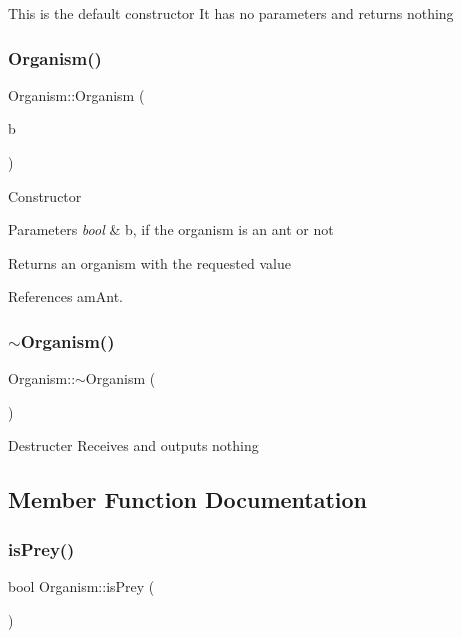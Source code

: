 This is the default constructor It has no parameters and returns nothing \mbox{\label{classOrganism_ac7d3dbebaf5df39d0a7883b2d76b4868}} 
\subsubsection{Organism()\hspace{0.1cm}{\footnotesize\ttfamily [2/2]}}
{\footnotesize\ttfamily Organism\+::\+Organism (\begin{DoxyParamCaption}\item[{bool}]{b }\end{DoxyParamCaption})}

Constructor 
\begin{DoxyParams}{Parameters}
{\em bool} & b, if the organism is an ant or not \\
\hline
\end{DoxyParams}
\begin{DoxyReturn}{Returns}
an organism with the requested value 
\end{DoxyReturn}


References am\+Ant.

\mbox{\label{classOrganism_aa5aa2e9fc3134358c929fa0c9d230c3b}} 
\subsubsection{$\sim$\+Organism()}
{\footnotesize\ttfamily Organism\+::$\sim$\+Organism (\begin{DoxyParamCaption}{ }\end{DoxyParamCaption})\hspace{0.3cm}{\ttfamily [virtual]}}

Destructer Receives and outputs nothing 

\subsection{Member Function Documentation}
\mbox{\label{classOrganism_aa5213b2e2b0c4f227dc7dfc4c4ab411c}} 
\subsubsection{is\+Prey()}
{\footnotesize\ttfamily bool Organism\+::is\+Prey (\begin{DoxyParamCaption}{ }\end{DoxyParamCaption})}

